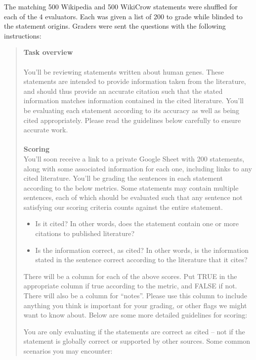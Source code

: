 The matching 500 Wikipedia and 500 WikiCrow statements were shuffled for each of the 4 evaluators. Each was given a list of 200 to grade while blinded to the statement origins. Graders were sent the questions with the following instructions: 

\begin{quote}
\textbf{Task overview}\\ \\
You’ll be reviewing statements written about human genes. These statements are intended to provide information taken from the literature, and should thus provide an accurate citation such that the stated information matches information contained in the cited literature. You’ll be evaluating each statement according to its accuracy as well as being cited appropriately. Please read the guidelines below carefully to ensure accurate work.\\ \\
\textbf{Scoring} \\

You’ll soon receive a link to a private Google Sheet with 200 statements, along with some associated information for each one, including links to any cited literature. You’ll be grading the sentences in each statement according to the below metrics. Some statements may contain multiple sentences, each of which should be evaluated such that any sentence not satisfying our scoring criteria counts against the entire statement. \\
\begin{itemize}
\item{Is it cited? In other words, does the statement contain one or more citations to published literature?}
\item{Is the information correct, as cited? In other words, is the information stated in the sentence correct according to the literature that it cites?\\}
\end{itemize}

There will be a column for each of the above scores. Put TRUE in the appropriate column if true according to the metric, and FALSE if not. There will also be a column for “notes”. Please use this column to include anything you think is important for your grading, or other flags we might want to know about. Below are some more detailed guidelines for scoring:

You are only evaluating if the statements are correct as cited -- not if the statement is globally correct or supported by other sources. Some common scenarios you may encounter:


\end{quote}
